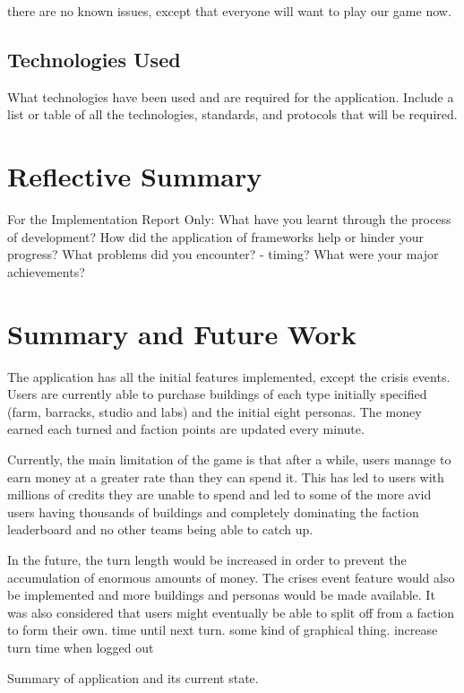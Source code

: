 \documentclass{sig-alt-release2}
\begin{document}
there are no known issues, except that everyone will want to play our game now.

\subsection{Technologies Used}

What technologies have been used and are required for the application. Include a list or table of all the technologies, standards, and protocols that will be required.

\section{Reflective Summary}

For the Implementation Report Only:
What have you learnt through the process of development? 
How did the application of frameworks help or hinder your progress?
What problems did you encounter? - timing?
What were your major achievements?


\section{Summary and Future Work}

The application has all the initial features implemented, except the crisis events. Users are currently able to purchase buildings of each type initially specified (farm, barracks, studio and labs) and the initial eight personas. The money earned each turned and faction points are updated every minute.

Currently, the main limitation of the game is that after a while, users manage to earn money at a greater rate than they can spend it. This has led to users with millions of credits they are unable to spend and led to some of the more avid users having thousands of buildings and completely dominating the faction leaderboard and no other teams being able to catch up.

In the future, the turn length would be increased in order to prevent the accumulation of enormous amounts of money. The crises event feature would also be implemented and more buildings and personas would be made available. It was also considered that users might eventually be able to split off from a faction to form their own. time until next turn. some kind of graphical thing. increase turn time when logged out

Summary of application and its current state.
\end{document}
